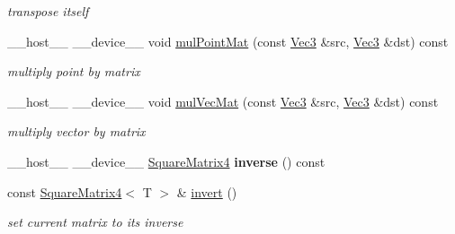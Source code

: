 \begin{DoxyCompactItemize}
\begin{DoxyCompactList}\small\item\em transpose itself \end{DoxyCompactList}\item 
\+\_\+\+\_\+host\+\_\+\+\_\+ \+\_\+\+\_\+device\+\_\+\+\_\+ void \hyperlink{class_square_matrix4_a96f083743422ca964d865b1034e608b4}{mul\+Point\+Mat} (const \hyperlink{class_vec3}{Vec3} \&src, \hyperlink{class_vec3}{Vec3} \&dst) const
\begin{DoxyCompactList}\small\item\em multiply point by matrix \end{DoxyCompactList}\item 
\+\_\+\+\_\+host\+\_\+\+\_\+ \+\_\+\+\_\+device\+\_\+\+\_\+ void \hyperlink{class_square_matrix4_a559765a38296c2949976c00347098fb0}{mul\+Vec\+Mat} (const \hyperlink{class_vec3}{Vec3} \&src, \hyperlink{class_vec3}{Vec3} \&dst) const
\begin{DoxyCompactList}\small\item\em multiply vector by matrix \end{DoxyCompactList}\item 
\+\_\+\+\_\+host\+\_\+\+\_\+ \+\_\+\+\_\+device\+\_\+\+\_\+ \hyperlink{class_square_matrix4}{Square\+Matrix4} {\bfseries inverse} () const\hypertarget{class_square_matrix4_a5af6eeea8a8080858fc607a7e6a25c79}{}\label{class_square_matrix4_a5af6eeea8a8080858fc607a7e6a25c79}

\item 
const \hyperlink{class_square_matrix4}{Square\+Matrix4}$<$ T $>$ \& \hyperlink{class_square_matrix4_acbf913e66c1c7b846bc25d7b2c0df31d}{invert} ()\hypertarget{class_square_matrix4_acbf913e66c1c7b846bc25d7b2c0df31d}{}\label{class_square_matrix4_acbf913e66c1c7b846bc25d7b2c0df31d}

\begin{DoxyCompactList}\small\item\em set current matrix to its inverse \end{DoxyCompactList}\end{DoxyCompactItemize}
